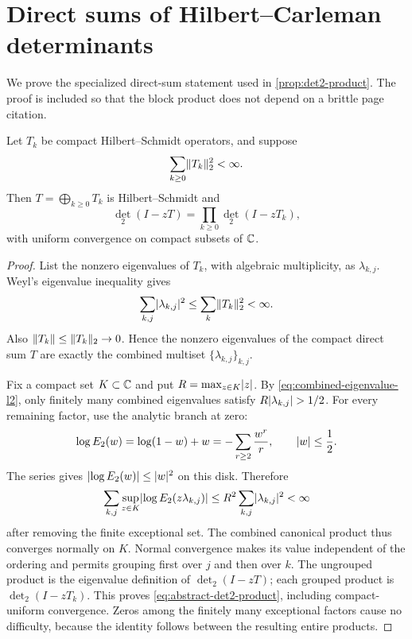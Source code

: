\section{Direct sums of Hilbert--Carleman determinants}
\label{app:determinants}

We prove the specialized direct-sum statement used in
\cref{prop:det2-product}.  The proof is included so that the block product
does not depend on a brittle page citation.

\begin{lemma}
\label{lem:abstract-det2-sum}
Let $T_k$ be compact Hilbert--Schmidt operators, and suppose
\[
  \sum_{k\ge0}\lVert T_k\rVert_2^2<\infty.
\]
Then $T=\bigoplus_{k\ge0}T_k$ is Hilbert--Schmidt and
\begin{equation}
  \det_2(I-zT)=\prod_{k\ge0}\det_2(I-zT_k),
  \label{eq:abstract-det2-product}
\end{equation}
with uniform convergence on compact subsets of $\mathbb C$.
\end{lemma}

\begin{proof}
List the nonzero eigenvalues of $T_k$, with algebraic multiplicity, as
$\lambda_{k,j}$.  Weyl's eigenvalue inequality gives
\begin{equation}
  \sum_{k,j}\lvert \lambda_{k,j}\rvert^2
  \le\sum_k\lVert T_k\rVert_2^2<\infty.
  \label{eq:combined-eigenvalue-l2}
\end{equation}
Also $\lVert T_k\rVert\le\lVert T_k\rVert_2\to0$.  Hence the nonzero eigenvalues of the
compact direct sum $T$ are exactly the combined multiset
$\{\lambda_{k,j}\}_{k,j}$.

Fix a compact set $K\subset\mathbb C$ and put $R=\max_{z\in K}\lvert z\rvert$.  By
\cref{eq:combined-eigenvalue-l2}, only finitely many combined eigenvalues
satisfy $R\lvert \lambda_{k,j}\rvert>1/2$.  For every remaining factor, use the
analytic branch at zero:
\begin{equation}
  \log E_2(w)=\log(1-w)+w
  =-\sum_{r\ge2}\frac{w^r}{r},
  \qquad \lvert w\rvert\le\frac12.
  \label{eq:E2-log-bound}
\end{equation}
The series gives $\lvert \log E_2(w)\rvert\le\lvert w\rvert^2$ on this disk.  Therefore
\[
  \sum_{k,j}\sup_{z\in K}
  \lvert \log E_2(z\lambda_{k,j})\rvert
  \le R^2\sum_{k,j}\lvert \lambda_{k,j}\rvert^2<\infty
\]
after removing the finite exceptional set.  The combined canonical product
thus converges normally on $K$.  Normal convergence makes its value
independent of the ordering and permits grouping first over $j$ and then
over $k$.  The ungrouped product is the eigenvalue definition of
$\det_2(I-zT)$; each grouped product is $\det_2(I-zT_k)$.  This proves
\cref{eq:abstract-det2-product}, including compact-uniform convergence.
Zeros among the finitely many exceptional factors cause no difficulty,
because the identity follows between the resulting entire products.
\end{proof}


